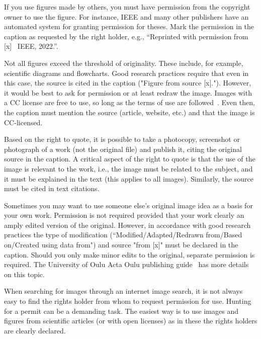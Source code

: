 If you use figures made by others, you must have permission from the
copyright owner to use the figure. For instance, IEEE and many other
publishers have an automated system for granting permission for
theses. Mark the permission in the caption as requested by the right
holder, e.g., “Reprinted with permission from [x] \textcopyright\ IEEE, 2022.”.

Not all figures exceed the threshold of originality. These include,
for example, scientific diagrams and flowcharts. Good research
practices require that even in this case, the source is cited in the
caption ("Figure from source [x]."). However, it would be best to ask
for permission or at least redraw the image. Images with a CC license 
are free to use, so long as the terms of use are followed~\cite{about_cc_licenses}. Even then, the
caption must mention the source (article, website, etc.) and that the
image is CC-licensed.

Based on the right to quote, it is possible to take a photocopy,
screenshot or photograph of a work (not the original file) and publish
it, citing the original source in the caption. A critical aspect of
the right to quote is that the use of the image is relevant to the
work, i.e., the image must be related to the subject, and it must be
explained in the text (this applies to all images). Similarly, the
source must be cited in text citations.

Sometimes you may want to use someone else's original image idea as a
basis for your own work. Permission is not required provided that your
work clearly an amply edited version of the original. However, in
accordance with good research practices the type of modification
(“Modified/Adapted/Redrawn from/Based on/Created using
data from") and source "from [x]" must be declared in
the caption. Should you only make minor edits to the original,
separate permission is required. The University of Oulu Acta Oulu
publishing guide~\cite{ronkainen_copyright, ronkainen_tekijanoikeus}
has more details on this topic.

When searching for images through an internet image search, it is not
always easy to find the rights holder from whom to request permission
for use. Hunting for a permit can be a demanding task. The easiest way
is to use images and figures from scientific articles (or with open licenses) as in these the
rights holders are clearly declared.

